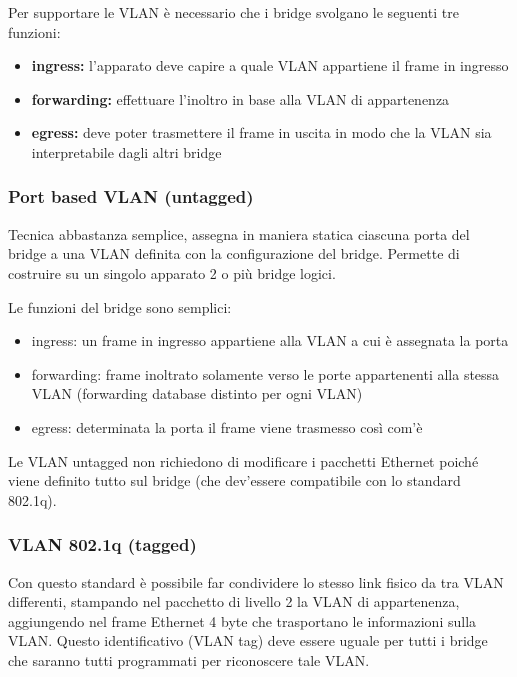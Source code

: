 \documentclass{report}
\begin{document}
Per supportare le VLAN è necessario che i bridge svolgano le seguenti
tre funzioni:

\begin{itemize}
\item
  \textbf{ingress: }l'apparato deve capire a quale VLAN appartiene il
  frame in ingresso
\item
  \textbf{forwarding: }effettuare l'inoltro in base alla VLAN di
  appartenenza
\item
  \textbf{egress: }deve poter trasmettere il frame in uscita in modo che
  la VLAN sia interpretabile dagli altri bridge
\end{itemize}

\hypertarget{header-n329}{%
\subsubsection{Port based VLAN (untagged)}\label{header-n329}}

Tecnica abbastanza semplice, assegna in maniera statica ciascuna porta
del bridge a una VLAN definita con la configurazione del bridge.
Permette di costruire su un singolo apparato 2 o più bridge logici.

Le funzioni del bridge sono semplici:

\begin{itemize}
\item
  ingress: un frame in ingresso appartiene alla VLAN a cui è assegnata
  la porta
\item
  forwarding: frame inoltrato solamente verso le porte appartenenti alla
  stessa VLAN (forwarding database distinto per ogni VLAN)
\item
  egress: determinata la porta il frame viene trasmesso così com'è
\end{itemize}

Le VLAN untagged non richiedono di modificare i pacchetti Ethernet
poiché viene definito tutto sul bridge (che dev'essere compatibile con
lo standard 802.1q).

\hypertarget{header-n340}{%
\subsubsection{VLAN 802.1q (tagged)}\label{header-n340}}

Con questo standard è possibile far condividere lo stesso link fisico da
tra VLAN differenti, stampando nel pacchetto di livello 2 la VLAN di
appartenenza, aggiungendo nel frame Ethernet 4 byte che trasportano le
informazioni sulla VLAN. Questo identificativo (VLAN tag) deve essere
uguale per tutti i bridge che saranno tutti programmati per riconoscere
tale VLAN.
\end{document}
